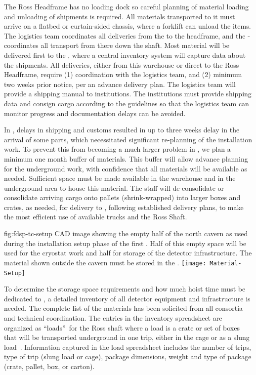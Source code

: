 The Ross Headframe has no loading dock so careful planning of material loading and unloading of shipments is required. 
All materials transported to it must arrive on a flatbed or curtain-sided chassis, where a forklift can unload  the items. 
The logistics team coordinates all deliveries from the  to the headframe, and the - coordinates all transport from there down the shaft.  
Most material will be delivered first to the , where a central inventory system will capture data about the shipments.  
All deliveries, either from this warehouse or direct to the Ross Headframe, require (1) coordination with the logistics team, and (2) minimum two weeks prior notice, per an advance delivery plan.  
The logistics team will provide a shipping manual  to  institutions. 
The institutions must provide shipping data and consign cargo according to the guidelines so that the logistics team can monitor progress and documentation delays can be avoided. 


In , delays in shipping and customs resulted in up to three weeks delay in the arrival of some parts, which necessitated significant re-planning of the installation work. 
To prevent this from becoming a much larger problem in , we plan a minimum one month buffer of materials. 
This buffer will allow advance planning for the underground work, with confidence that all materials will be available as needed. 
Sufficient space must be made available in the warehouse and in the underground area  to house this material.
The  staff will de-consolidate or consolidate arriving cargo onto pallets (shrink-wrapped)  into larger boxes and crates, as needed, for  delivery to , following established delivery plans, to make the most efficient use of available trucks and the Ross Shaft. 

\begin{dunefigure}{fig:fdsp-tc-setup}
  {CAD image showing the empty half of the north cavern as used during the installation setup phase of the first .  Half of this empty space will be used for the cryostat work and half for storage of the detector infrastructure. The material shown outside the cavern must be stored in the .}
\texttt{[image: Material-Setup]}
\end{dunefigure}


To determine the  storage space requirements and how much hoist time must be dedicated to , a detailed inventory of all detector equipment and  infrastructure is needed. 
The complete list of the materials has been solicited from all consortia and technical coordination. 
The entries in the inventory spreadsheet are organized as \textquotedblleft loads\textquotedblright \ for the Ross shaft where a load is a crate or set of boxes that will be transported underground in one trip, either in the cage or as a slung load~\cite{bib:docdb8426}. 
Information captured in the load spreadsheet includes the number of  
trips, type of trip (slung load or cage), package dimensions, weight and type of package (crate, pallet, box, or carton). 

